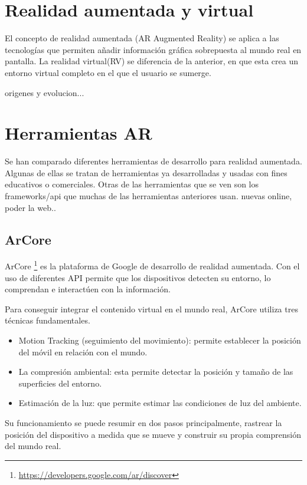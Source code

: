 

\section{Realidad aumentada y virtual}
El concepto de realidad aumentada (AR Augmented Reality) se aplica a las tecnologías que permiten añadir información gráfica sobrepuesta al mundo real en pantalla.
La realidad virtual(RV) se diferencia de la anterior, en que esta crea un entorno virtual completo en el que el usuario se sumerge.
 
origenes y evolucion...




\section{Herramientas AR}
Se han comparado diferentes herramientas de desarrollo para realidad aumentada. Algunas de ellas se tratan de herramientas ya desarrolladas y usadas con fines educativos o comerciales. Otras de las herramientas que se ven son los frameworks/api que muchas de las herramientas anteriores usan.
nuevas online, poder la web.. 

\subsection{ArCore}
ArCore \footnote{\url{https://developers.google.com/ar/discover}} es la plataforma de Google de desarrollo de realidad aumentada. Con el uso de diferentes API permite que los dispositivos detecten su entorno, lo comprendan e interactúen con la información.

Para conseguir integrar el contenido virtual en el mundo real, ArCore utiliza tres técnicas fundamentales.
\begin{itemize}
	\item Motion Tracking (seguimiento del movimiento): permite establecer la posición del móvil en relación con el mundo.
	\item La compresión ambiental: esta permite detectar la posición y tamaño de las superficies del entorno.
	\item Estimación de la luz: que permite estimar las condiciones de luz del ambiente.
\end{itemize}

Su funcionamiento se puede resumir en dos pasos principalmente, rastrear la posición del dispositivo a medida que se mueve y construir su propia comprensión del mundo real.

